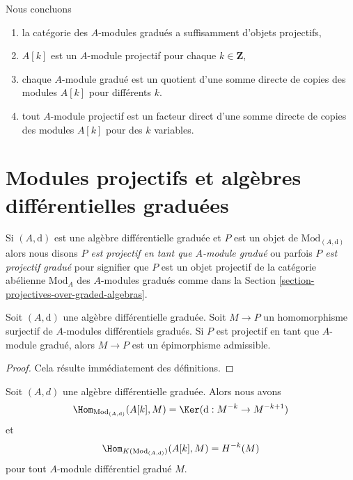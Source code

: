 \medskip\noindent
Nous concluons
\begin{enumerate}
\item la catégorie des $A$-modules gradués a suffisamment d’objets projectifs,
\item $A[k]$ est un $A$-module projectif pour chaque $k \in \mathbf{Z}$,
\item chaque $A$-module gradué est un quotient d’une somme directe de copies des
modules $A[k]$ pour différents $k$.
\item tout $A$-module projectif est un facteur direct d'une somme directe de
copies des modules $A[k]$ pour des $k$ variables.
\end{enumerate}




\section{Modules projectifs et algèbres différentielles graduées}
\label{section-projective-over-differential-graded}

\noindent
Si $(A, \text{d})$ est une algèbre différentielle graduée et $P$ est un objet de
$\text{Mod}_{(A, \text{d})}$ alors nous disons {\it $P$ est projectif en tant que
$A$-module gradué} ou parfois {\it $P$ est projectif gradué} pour signifier que
$P$ est un objet projectif de la catégorie abélienne $\text{Mod}_A$ des
$A$-modules gradués comme dans la Section
\ref{section-projectives-over-graded-algebras}.

\begin{lemma}
\label{lemma-target-graded-projective}
Soit $(A, \text{d})$ une algèbre différentielle graduée. Soit $M \to P$ un
homomorphisme surjectif de $A$-modules différentiels gradués. Si $P$ est projectif
en tant que $A$-module gradué, alors $M \to P$ est un épimorphisme admissible.
\end{lemma}

\begin{proof}
Cela résulte immédiatement des définitions.
\end{proof}

\begin{lemma}
\label{lemma-hom-from-shift-free}
Soit $(A, d)$ une algèbre différentielle graduée. Alors nous avons
$$
\Hom_{\text{Mod}_{(A, \text{d})}}(A[k], M) =
\Ker(\text{d} : M^{-k} \to M^{-k + 1})
$$
et
$$
\Hom_{K(\text{Mod}_{(A, \text{d})})}(A[k], M) = H^{-k}(M)
$$
pour tout $A$-module différentiel gradué $M$.
\end{lemma}

